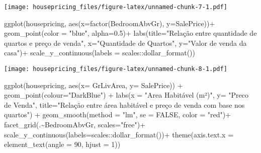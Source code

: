 \documentclass[
]{article}
\newenvironment{Shaded}{\begin{snugshade}}{\end{snugshade}}
\newcommand{\AttributeTok}[1]{\textcolor[rgb]{0.77,0.63,0.00}{#1}}
\newcommand{\ConstantTok}[1]{\textcolor[rgb]{0.00,0.00,0.00}{#1}}
\newcommand{\DecValTok}[1]{\textcolor[rgb]{0.00,0.00,0.81}{#1}}
\newcommand{\FloatTok}[1]{\textcolor[rgb]{0.00,0.00,0.81}{#1}}
\newcommand{\FunctionTok}[1]{\textcolor[rgb]{0.00,0.00,0.00}{#1}}
\newcommand{\NormalTok}[1]{#1}
\newcommand{\SpecialCharTok}[1]{\textcolor[rgb]{0.00,0.00,0.00}{#1}}
\newcommand{\StringTok}[1]{\textcolor[rgb]{0.31,0.60,0.02}{#1}}
\begin{document}
\texttt{[image: housepricing\_files/figure-latex/unnamed-chunk-7-1.pdf]}

\begin{Shaded}
\begin{Highlighting}[]
\FunctionTok{ggplot}\NormalTok{(housepricing, }\FunctionTok{aes}\NormalTok{(}\AttributeTok{x=}\FunctionTok{factor}\NormalTok{(BedroomAbvGr), }\AttributeTok{y=}\NormalTok{SalePrice))}\SpecialCharTok{+}
  \FunctionTok{geom\_point}\NormalTok{(}\AttributeTok{color =} \StringTok{"blue"}\NormalTok{, }\AttributeTok{alpha=}\FloatTok{0.5}\NormalTok{)}\SpecialCharTok{+}
  \FunctionTok{labs}\NormalTok{(}\AttributeTok{title=}\StringTok{"Relação entre quantidade de quartos e preço de venda"}\NormalTok{, }\AttributeTok{x=}\StringTok{"Quantidade de Quartos"}\NormalTok{, }\AttributeTok{y=}\StringTok{"Valor de venda da casa"}\NormalTok{)}\SpecialCharTok{+}
  \FunctionTok{scale\_y\_continuous}\NormalTok{(}\AttributeTok{labels =}\NormalTok{ scales}\SpecialCharTok{::}\FunctionTok{dollar\_format}\NormalTok{())}
\end{Highlighting}
\end{Shaded}

\texttt{[image: housepricing\_files/figure-latex/unnamed-chunk-8-1.pdf]}

\begin{Shaded}
\begin{Highlighting}[]
\FunctionTok{ggplot}\NormalTok{(housepricing, }\FunctionTok{aes}\NormalTok{(}\AttributeTok{x=}\NormalTok{ GrLivArea, }\AttributeTok{y=}\NormalTok{ SalePrice)) }\SpecialCharTok{+}
  \FunctionTok{geom\_point}\NormalTok{(}\AttributeTok{colour=}\StringTok{"DarkBlue"}\NormalTok{) }\SpecialCharTok{+}
  \FunctionTok{labs}\NormalTok{(}\AttributeTok{x =} \StringTok{"Area Habitável (m²)"}\NormalTok{, }\AttributeTok{y=} \StringTok{"Preco de Venda"}\NormalTok{, }\AttributeTok{title=}\StringTok{"Relação entre área habitável e preço de venda com base nos quartos"}\NormalTok{) }\SpecialCharTok{+}
  \FunctionTok{geom\_smooth}\NormalTok{(}\AttributeTok{method =} \StringTok{"lm"}\NormalTok{, }\AttributeTok{se =} \ConstantTok{FALSE}\NormalTok{, }\AttributeTok{color =} \StringTok{"red"}\NormalTok{)}\SpecialCharTok{+}
  \FunctionTok{facet\_grid}\NormalTok{(.}\SpecialCharTok{\textasciitilde{}}\NormalTok{BedroomAbvGr, }\AttributeTok{scales=}\StringTok{"free"}\NormalTok{)}\SpecialCharTok{+}
  \FunctionTok{scale\_y\_continuous}\NormalTok{(}\AttributeTok{labels=}\NormalTok{scales}\SpecialCharTok{::}\FunctionTok{dollar\_format}\NormalTok{())}\SpecialCharTok{+}
  \FunctionTok{theme}\NormalTok{(}\AttributeTok{axis.text.x =} \FunctionTok{element\_text}\NormalTok{(}\AttributeTok{angle =} \DecValTok{90}\NormalTok{, }\AttributeTok{hjust =} \DecValTok{1}\NormalTok{))}
\end{Highlighting}
\end{Shaded}
\end{document}
